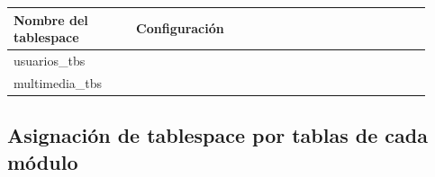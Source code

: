 \documentclass{article}
\def\arraystretch{1}
\begin{document}
{
  \setlength\tabcolsep{3.5mm}
  \def\arraystretch{2}          %
  \begin{longtable}{
    |p{0.27\linewidth}
    |p{0.65\linewidth}|}
  \hline
  \textbf{Nombre del tablespace} & 
  \textbf{Configuración}
  \\ \hline
  usuarios\_tbs & 
  \\ \hline
  multimedia\_tbs & 
  \\ \hline
  \end{longtable}
}

\subsection{Asignación de tablespace por tablas de cada módulo}
\end{document}
